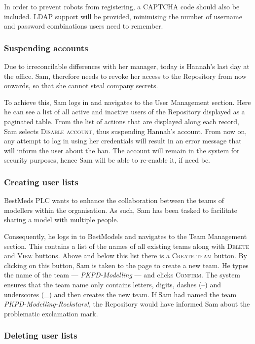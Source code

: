 \begin{techNote}
In order to prevent robots from registering, a CAPTCHA code should also be included. LDAP support will be provided, minimising the number of username and password combinations users need to remember. 
\end{techNote}


\subsubsection{Suspending accounts}
Due to irreconcilable differences with her manager, today is Hannah's last day at the office. Sam, therefore needs to revoke her access to the Repository from now onwards, so that she cannot steal company secrets. 

To achieve this, Sam logs in and navigates to the User Management section. Here he can see a list of all active and inactive users of the Repository displayed as a paginated table. From the list of actions that are displayed along each record, Sam selects \textsc{Disable account}, thus suspending Hannah's account. From now on, any attempt to log in using her credentials will result in an error message that will inform the user about the ban. The account will remain in the system for security purposes, hence Sam will be able to re-enable it, if need be.

\subsubsection{Creating user lists}
BestMeds PLC  wants to enhance the collaboration between the teams of modellers within the organisation. As such, Sam has been tasked to facilitate sharing a model with multiple people.

Consequently, he logs in to BestModels and navigates to the Team Management section. This contains a list of the names of all existing teams along with \textsc{Delete} and \textsc{View} buttons. Above and below this list there is a \textsc{Create team} button. By clicking on this button, Sam is taken to the page to create a new team. He types the name of the team --- \emph{PKPD-Modelling} --- and clicks \textsc{Confirm}. The system ensures that the team name only contains letters, digits, dashes (--) and underscores (\_) and then creates the new team. If Sam had named the team \emph{PKPD-Modelling-Rockstars!}, the Repository would have informed Sam about the problematic exclamation mark.

\subsubsection{Deleting user lists}

